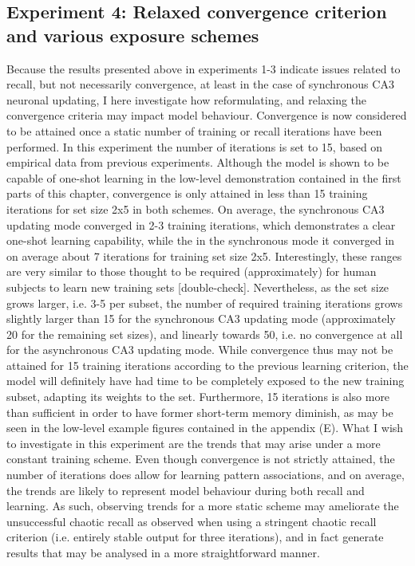 \subsection{Experiment 4: Relaxed convergence criterion and various exposure schemes}

Because the results presented above in experiments 1-3 indicate issues related to recall, but not necessarily convergence, at least in the case of synchronous CA3 neuronal updating, I here investigate how reformulating, and relaxing the convergence criteria may impact model behaviour. Convergence is now considered to be attained once a static number of training or recall iterations have been performed. In this experiment the number of iterations is set to 15, based on empirical data from previous experiments. Although the model is shown to be capable of one-shot learning in the low-level demonstration contained in the first parts of this chapter, convergence is only attained in less than 15 training iterations for set size 2x5 in both schemes. On average, the synchronous CA3 updating mode converged in 2-3 training iterations, which demonstrates a clear one-shot learning capability, while the in the synchronous mode it converged in on average about 7 iterations for training set size 2x5. Interestingly, these ranges are very similar to those thought to be required (approximately) for human subjects to learn new training sets \citep{Rolls1998chpt6} [double-check]. Nevertheless, as the set size grows larger, i.e. 3-5 per subset, the number of required training iterations grows slightly larger than 15 for the synchronous CA3 updating mode (approximately 20 for the remaining set sizes), and linearly towards 50, i.e. no convergence at all for the asynchronous CA3 updating mode.
While convergence thus may not be attained for 15 training iterations according to the previous learning criterion, the model will definitely have had time to be completely exposed to the new training subset, adapting its weights to the set. Furthermore, 15 iterations is also more than sufficient in order to have former short-term memory diminish, as may be seen in the low-level example figures contained in the appendix (E).
What I wish to investigate in this experiment are the trends that may arise under a more constant training scheme. Even though convergence is not strictly attained, the number of iterations does allow for learning pattern associations, and on average, the trends are likely to represent model behaviour during both recall and learning. As such, observing trends for a more static scheme may ameliorate the unsuccessful chaotic recall as observed when using a stringent chaotic recall criterion (i.e. entirely stable output for three iterations), and in fact generate results that may be analysed in a more straightforward manner.

